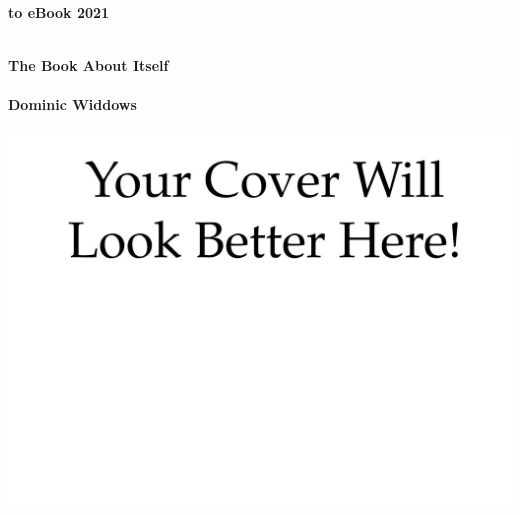 
\thispagestyle{empty}

\vspace{3cm}
  \begin{center}
	\bfseries \Huge \latex to eBook 2021 \par   %
        ~\\
	\bfseries \LARGE The Book About Itself \\   %
        ~\\
        \bfseries \Large Dominic Widdows \par   %

        \vspace{3cm}
    
      	\includegraphics[width=0.8\linewidth]{images/cover.png}
    \end{center}
    
\par

\newpage
